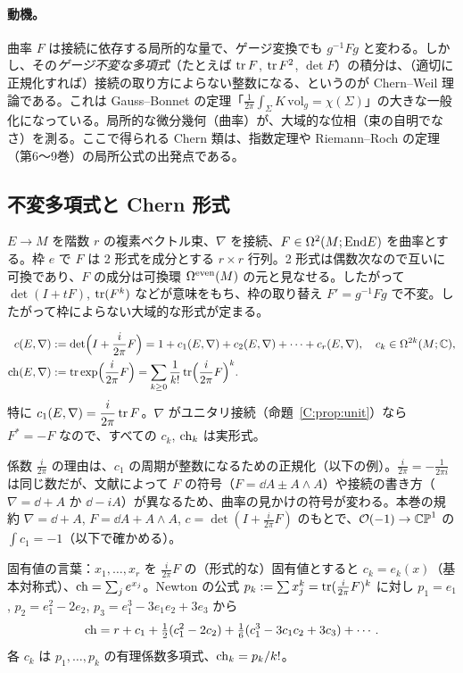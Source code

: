 \paragraph{動機。}曲率 $F$ は接続に依存する局所的な量で、ゲージ変換でも $g^{-1}Fg$ と変わる。しかし、その\emph{ゲージ不変な多項式}（たとえば $\operatorname{tr} F$, $\operatorname{tr} F^2$, $\det F$）の積分は、（適切に正規化すれば）接続の取り方によらない整数になる、というのが Chern--Weil 理論である。これは Gauss--Bonnet の定理「$\frac1{2\pi}\int_\Sigma K\,\mathrm{vol}_g=\chi(\Sigma)$」の大きな一般化になっている。局所的な微分幾何（曲率）が、大域的な位相（束の自明でなさ）を測る。ここで得られる Chern 類は、指数定理や Riemann--Roch の定理（第6〜9巻）の局所公式の出発点である。

\subsection{不変多項式と Chern 形式}
$E\to M$ を階数 $r$ の複素ベクトル束、$\nabla$ を接続、$F\in\Omega^2(M;\mathrm{End} E)$ を曲率とする。枠 $e$ で $F$ は 2 形式を成分とする $r\times r$ 行列。2 形式は偶数次なので互いに可換であり、$F$ の成分は可換環 $\Omega^{\mathrm{even}}(M)$ の元と見なせる。したがって $\det(I+tF)$, $\operatorname{tr}(F^k)$ などが意味をもち、枠の取り替え $F'=g^{-1}Fg$ で不変。したがって枠によらない大域的な形式が定まる。

\begin{defn}\label{C:def:chernform}
\begin{align*}
c(E,\nabla)&:=\det\Bigl(I+\frac i{2\pi}F\Bigr)=1+c_1(E,\nabla)+c_2(E,\nabla)+\cdots+c_r(E,\nabla),\quad c_k\in\Omega^{2k}(M;\mathbb C),\\
\mathrm{ch}(E,\nabla)&:=\operatorname{tr}\exp\Bigl(\frac i{2\pi}F\Bigr)=\sum_{k\ge0}\frac1{k!}\operatorname{tr}\Bigl(\frac i{2\pi}F\Bigr)^k.
\end{align*}
特に $c_1(E,\nabla)=\dfrac i{2\pi}\operatorname{tr} F$。$\nabla$ がユニタリ接続（命題~\ref{C:prop:unit}）なら $F^*=-F$ なので、すべての $c_k$, $\mathrm{ch}_k$ は実形式。
\end{defn}
係数 $\frac i{2\pi}$ の理由は、$c_1$ の周期が整数になるための正規化（以下の例）。$\frac i{2\pi}=-\frac1{2\pi i}$ は同じ数だが、文献によって $F$ の符号（$F=\dd A\pm A\wedge A$）や接続の書き方（$\nabla=\dd+A$ か $\dd-iA$）が異なるため、曲率の見かけの符号が変わる。本巻の規約 $\nabla=\dd+A$, $F=\dd A+A\wedge A$, $c=\det(I+\frac i{2\pi}F)$ のもとで、$\mathcal O(-1)\to\mathbb{CP}^1$ の $\int c_1=-1$（以下で確かめる）。

固有値の言葉：$x_1,\dots,x_r$ を $\frac i{2\pi}F$ の（形式的な）固有値とすると $c_k=e_k(x)$（基本対称式）、$\mathrm{ch}=\sum_je^{x_j}$。Newton の公式 $p_k:=\sum x_j^k=\operatorname{tr}(\frac i{2\pi}F)^k$ に対し $p_1=e_1$, $p_2=e_1^2-2e_2$, $p_3=e_1^3-3e_1e_2+3e_3$ から
\begin{equation}\label{C:eq:chexp}
\mathrm{ch}=r+c_1+\tfrac12(c_1^2-2c_2)+\tfrac16(c_1^3-3c_1c_2+3c_3)+\cdots.
\end{equation}
各 $c_k$ は $p_1,\dots,p_k$ の有理係数多項式、$\mathrm{ch}_k=p_k/k!$。


